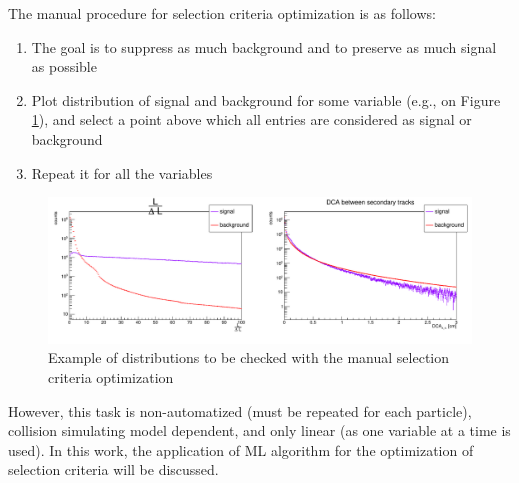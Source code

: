 The manual procedure for selection criteria optimization \cite{lubynets} is as follows:
\begin{enumerate}
    \item The goal is to suppress as much background and to preserve as much signal as possible 
    \item Plot distribution of signal and background for some variable (e.g., on Figure \ref{manual distributions}), and select a point above which all entries are considered as signal or background
    \item Repeat it for all the variables
\end{enumerate}
\begin{figure}[H]
    \centering
    \includegraphics[width=1\textwidth]{img/pfsimple_distributions.pdf}
     \caption{Example of distributions to be checked with the manual selection criteria optimization}
     \label{manual distributions}
\end{figure}

However, this task is non-automatized (must be repeated for each particle), collision simulating model dependent, and only linear (as one variable at a time is used). In this work, the application of ML algorithm for the optimization of selection criteria will be discussed.
